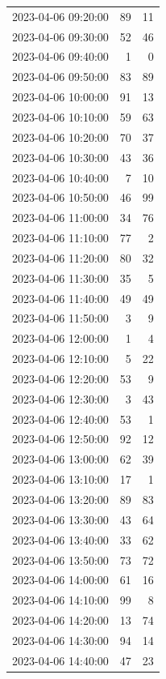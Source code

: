 \documentclass[
  letterpaper,
  DIV=11,
  numbers=noendperiod]{scrartcl}
\begin{document}
\begin{tabular}{lrr}
2023-04-06 09:20:00 &    89 &    11 \\
2023-04-06 09:30:00 &    52 &    46 \\
2023-04-06 09:40:00 &     1 &     0 \\
2023-04-06 09:50:00 &    83 &    89 \\
2023-04-06 10:00:00 &    91 &    13 \\
2023-04-06 10:10:00 &    59 &    63 \\
2023-04-06 10:20:00 &    70 &    37 \\
2023-04-06 10:30:00 &    43 &    36 \\
2023-04-06 10:40:00 &     7 &    10 \\
2023-04-06 10:50:00 &    46 &    99 \\
2023-04-06 11:00:00 &    34 &    76 \\
2023-04-06 11:10:00 &    77 &     2 \\
2023-04-06 11:20:00 &    80 &    32 \\
2023-04-06 11:30:00 &    35 &     5 \\
2023-04-06 11:40:00 &    49 &    49 \\
2023-04-06 11:50:00 &     3 &     9 \\
2023-04-06 12:00:00 &     1 &     4 \\
2023-04-06 12:10:00 &     5 &    22 \\
2023-04-06 12:20:00 &    53 &     9 \\
2023-04-06 12:30:00 &     3 &    43 \\
2023-04-06 12:40:00 &    53 &     1 \\
2023-04-06 12:50:00 &    92 &    12 \\
2023-04-06 13:00:00 &    62 &    39 \\
2023-04-06 13:10:00 &    17 &     1 \\
2023-04-06 13:20:00 &    89 &    83 \\
2023-04-06 13:30:00 &    43 &    64 \\
2023-04-06 13:40:00 &    33 &    62 \\
2023-04-06 13:50:00 &    73 &    72 \\
2023-04-06 14:00:00 &    61 &    16 \\
2023-04-06 14:10:00 &    99 &     8 \\
2023-04-06 14:20:00 &    13 &    74 \\
2023-04-06 14:30:00 &    94 &    14 \\
2023-04-06 14:40:00 &    47 &    23 \\

\end{tabular}
\end{document}
